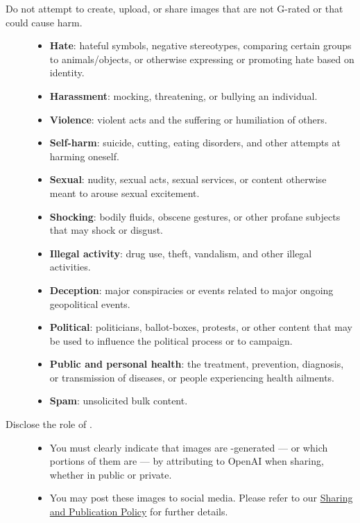 \begin{description}
\item[Do not attempt to create, upload, or share images that are not G-rated or
    that could cause harm.] \hfill

    \begin{itemize}
    \item \textbf{Hate}: hateful symbols, negative stereotypes, comparing certain
        groups to animals/objects, or otherwise expressing or promoting hate based
        on identity.
    \item \textbf{Harassment}: mocking, threatening, or bullying an individual.
    \item \textbf{Violence}: violent acts and the suffering or humiliation of
        others.
    \item \textbf{Self-harm}: suicide, cutting, eating disorders, and other attempts
        at harming oneself.
    \item \textbf{Sexual}: nudity, sexual acts, sexual services, or content
        otherwise meant to arouse sexual excitement.
    \item \textbf{Shocking}: bodily fluids, obscene gestures, or other profane
        subjects that may shock or disgust.
    \item \textbf{Illegal activity}: drug use, theft, vandalism, and other illegal
        activities.
    \item \textbf{Deception}: major conspiracies or events related to major ongoing
        geopolitical events.
    \item \textbf{Political}: politicians, ballot-boxes, protests, or other content
        that may be used to influence the political process or to campaign.
    \item \textbf{Public and personal health}: the treatment, prevention, diagnosis,
        or transmission of diseases, or people experiencing health ailments.
    \item \textbf{Spam}: unsolicited bulk content.
    \end{itemize}

\item[Disclose the role of \AI.] \hfill

    \begin{itemize}
    \item You must clearly indicate that images are \AI-generated --- or which
        portions of them are --- by attributing to OpenAI when sharing, whether in
        public or private.
    \item You may post these images to social media. Please refer to our
        \href{https://web.archive.org/web/20220803232350/https://openai.com/api/policies/sharing-publication/}{Sharing
        and Publication Policy} for further details.
    \end{itemize}



\end{description}
